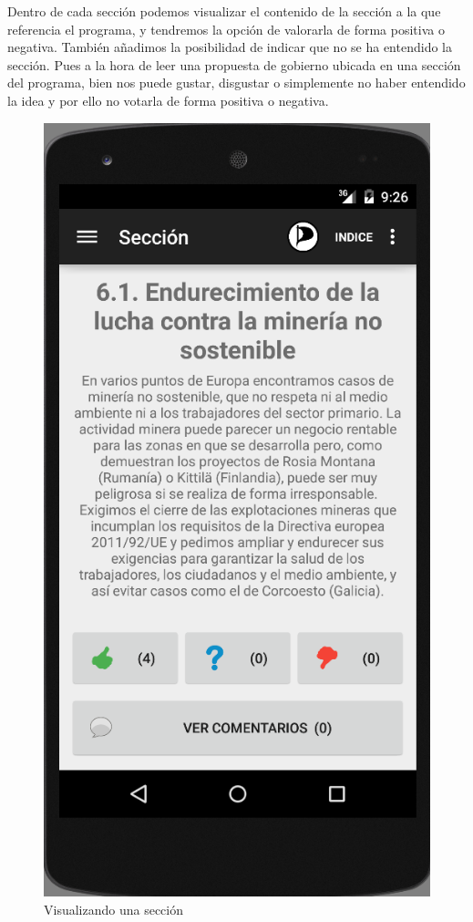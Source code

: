 Dentro de cada sección podemos visualizar el contenido de la sección a la que referencia el programa, y tendremos la opción de valorarla de forma positiva o negativa. También añadimos la posibilidad de indicar que no se ha entendido la sección. Pues a la hora de leer una propuesta de gobierno ubicada en una sección del programa, bien nos puede gustar, disgustar o simplemente no haber entendido la idea y por ello no votarla de forma positiva o negativa.

	\begin{figure}[H]
      \centering
	\includegraphics[keepaspectratio, scale=0.5]{Media/Captures/section.png}
      \caption{Visualizando una sección}
      \label{fig:captSection}
    \end{figure}
    
